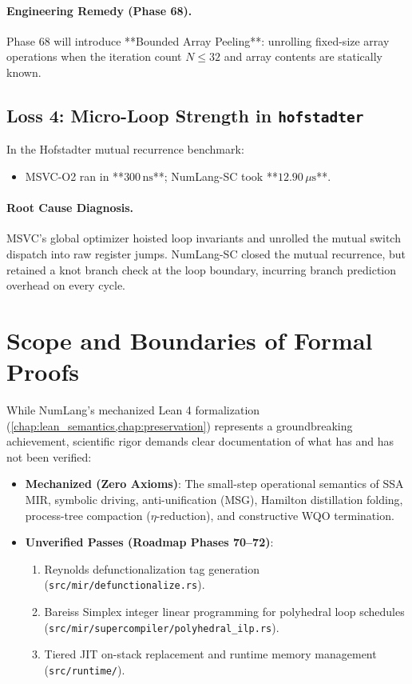 \paragraph{Engineering Remedy (Phase 68).}
Phase 68 will introduce **Bounded Array Peeling**: unrolling fixed-size array operations when the iteration count $N \le 32$ and array contents are statically known.

\subsection{Loss 4: Micro-Loop Strength in \texttt{hofstadter}}
In the Hofstadter mutual recurrence benchmark:
\begin{itemize}
    \item MSVC-O2 ran in **$300\,\text{ns}$**; NumLang-SC took **$12.90\,\mu\text{s}$**.
\end{itemize}

\paragraph{Root Cause Diagnosis.}
MSVC's global optimizer hoisted loop invariants and unrolled the mutual switch dispatch into raw register jumps. NumLang-SC closed the mutual recurrence, but retained a knot branch check at the loop boundary, incurring branch prediction overhead on every cycle.

\section{Scope and Boundaries of Formal Proofs}
\label{sec:lim:proof_scope}

While NumLang's mechanized Lean 4 formalization (\cref{chap:lean_semantics,chap:preservation}) represents a groundbreaking achievement, scientific rigor demands clear documentation of what has and has not been verified:

\begin{itemize}
    \item \textbf{Mechanized (Zero Axioms)}: The small-step operational semantics of SSA MIR, symbolic driving, anti-unification (MSG), Hamilton distillation folding, process-tree compaction ($\eta$-reduction), and constructive WQO termination.
    \item \textbf{Unverified Passes (Roadmap Phases 70--72)}:
    \begin{enumerate}
        \item Reynolds defunctionalization tag generation (\texttt{src/mir/defunctionalize.rs}).
        \item Bareiss Simplex integer linear programming for polyhedral loop schedules (\texttt{src/mir/supercompiler/polyhedral\_ilp.rs}).
        \item Tiered JIT on-stack replacement and runtime memory management (\texttt{src/runtime/}).
    \end{enumerate}
\end{itemize}

